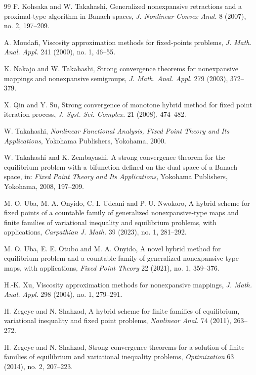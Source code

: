 \documentclass[leqno,12pt]{amsart}
\theoremstyle{definition}
\numberwithin{equation}{section}
\begin{document}
\begin{thebibliography}{99}
F. Kohsaka and W. Takahashi, Generalized nonexpansive retractions and a proximal-type algorithm in Banach spaces, \emph{J. Nonlinear Convex Anal.} 8 (2007), no. 2, 197--209.

A. Moudafi, Viscosity approximation methods for fixed-points problems, \emph{J. Math. Anal. Appl.} 241 (2000), no. 1, 46--55.

K. Nakajo and W. Takahashi, Strong convergence theorems for nonexpansive mappings and nonexpansive semigroups, \emph{J. Math. Anal. Appl.} 279 (2003), 372--379.

X. Qin and Y. Su, Strong convergence of monotone hybrid method for fixed point iteration process, \emph{J. Syst. Sci. Complex.} 21 (2008), 474--482.

W. Takahashi, \emph{Nonlinear Functional Analysis, Fixed Point Theory and Its Applications}, Yokohama Publishers, Yokohama, 2000.

W. Takahashi and K. Zembayashi, A strong convergence theorem for the equilibrium problem with a bifunction defined on the dual space of a Banach space, in: \emph{Fixed Point Theory and Its Applications}, Yokohama Publishers, Yokohama, 2008, 197--209.

M. O. Uba, M. A. Onyido, C. I. Udeani and P. U. Nwokoro, A hybrid scheme for fixed points of a countable family of generalized nonexpansive-type maps and finite families of variational inequality and equilibrium problems, with applications, \emph{Carpathian J. Math.} 39 (2023), no. 1, 281--292.

M. O. Uba, E. E. Otubo and M. A. Onyido, A novel hybrid method for equilibrium problem and a countable family of generalized nonexpansive-type maps, with applications, \emph{Fixed Point Theory} 22 (2021), no. 1, 359--376.

H.-K. Xu, Viscosity approximation methods for nonexpansive mappings, \emph{J. Math. Anal. Appl.} 298 (2004), no. 1, 279--291.

H. Zegeye and N. Shahzad, A hybrid scheme for finite families of equilibrium, variational inequality and fixed point problems, \emph{Nonlinear Anal.} 74 (2011), 263--272.

H. Zegeye and N. Shahzad, Strong convergence theorems for a solution of finite families of equilibrium and variational inequality problems, \emph{Optimization} 63 (2014), no. 2, 207--223.

\end{thebibliography}
\end{document}
